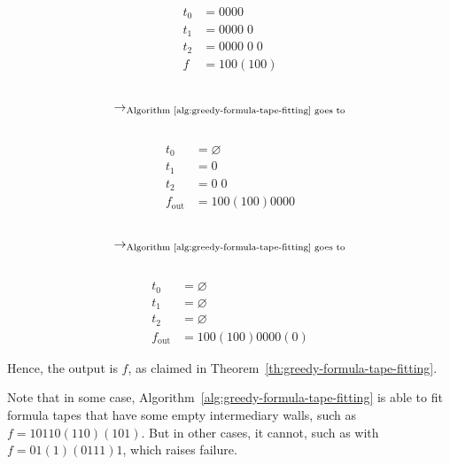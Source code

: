 \begin{example}
\begin{multicols}{5}
        \noindent
        \begin{align*}
            t_0 & = 0000           \\
            t_1 & =  0000 \; 0     \\
            t_2 & =  0000 \; 0\; 0 \\
            f   & = 100 (100)
        \end{align*}
        \begin{align*}
             &                                                                   \\
            \to_{\text{Algorithm~\ref{alg:greedy-formula-tape-fitting} goes to}} \\
             &
        \end{align*}
        \begin{align*}
            t_0          & = \varnothing    \\
            t_1          & =   0            \\
            t_2          & =   0\; 0        \\
            f_\text{out} & = 100 (100) 0000
        \end{align*}
        \begin{align*}
             &                                                                   \\
            \to_{\text{Algorithm~\ref{alg:greedy-formula-tape-fitting} goes to}} \\
             &
        \end{align*}
        \begin{align*}
            t_0          & = \varnothing        \\
            t_1          & =  \varnothing       \\
            t_2          & =  \varnothing       \\
            f_\text{out} & = 100 (100) 0000 (0)
        \end{align*}
    \end{multicols}

    Hence, the output is $f$, as claimed in Theorem~\ref{th:greedy-formula-tape-fitting}.

    Note that in some case, Algorithm~\ref{alg:greedy-formula-tape-fitting} is able to fit formula tapes that have some empty intermediary walls, such as $f=10110(110)(101)$. But in other cases, it cannot, such as with $f = 01 (1) (0111) 1$, which raises failure.

\end{example}

